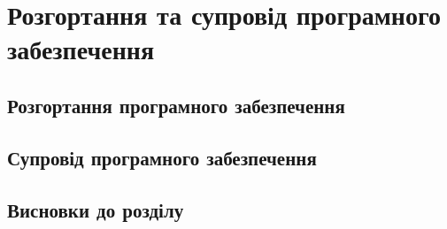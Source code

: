 \section{Розгортання та супровід програмного забезпечення}

\subsection{Розгортання програмного забезпечення}

\subsection{Супровід програмного забезпечення}

\subsection{Висновки до розділу}
